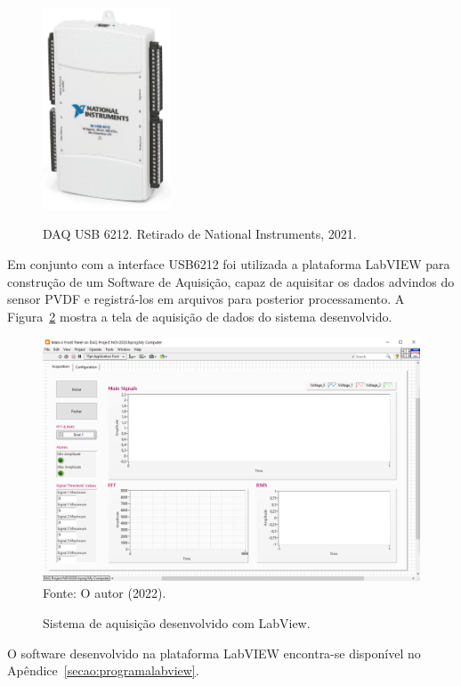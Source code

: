 \documentclass[
	12pt,				
	oneside,			
	a4paper,			
	english,			
	brazil,			
	]{abntex2ppgsi}
\begin{document}
\begin{figure}[H]
\centering
\caption {DAQ USB 6212. Retirado de National Instruments, 2021.}
\includegraphics[width=\textwidth,height=60mm,keepaspectratio]{USB6212}
\label{USB6212}
\end{figure}

Em conjunto com a interface USB6212 foi utilizada a plataforma LabVIEW para construção de um Software de Aquisição, capaz de aquisitar os dados advindos do sensor PVDF e registrá-los em arquivos para posterior processamento. A Figura~\ref{sistema_labview} mostra a tela de aquisição de dados do sistema desenvolvido. 

\begin{figure}[H]
\centering
\caption {Sistema de aquisição desenvolvido com LabView.}
\includegraphics[width=\textwidth,height=\textheight,keepaspectratio]{sistema_labview} \\
Fonte: O autor (2022).
\label{sistema_labview}
\end{figure} 

O software desenvolvido na plataforma LabVIEW encontra-se disponível no Apêndice~\ref{secao:programalabview}. 
\end{document}
